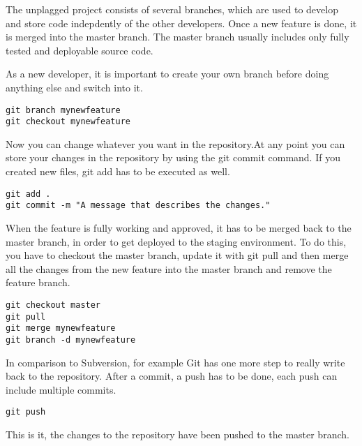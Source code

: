The unplagged project consists of several branches, which are used to develop and store code indepdently of the other developers. Once a new feature is done, it is merged into the master branch. The master branch usually includes only fully tested and deployable source code. 

As a new developer, it is important to create your own branch before doing anything else and switch into it.
\begin{verbatim}
git branch mynewfeature
git checkout mynewfeature
\end{verbatim}

Now you can change whatever you want in the repository.At any point you can store your changes in the repository by using the git commit command. If you created new files, git add has to be executed as well.

\begin{verbatim}
git add .
git commit -m "A message that describes the changes."
\end{verbatim}

When the feature is fully working and approved, it has to be merged back to the master branch, in order to get deployed to the staging environment. To do this, you have to checkout the master branch, update it with git pull and then merge all the changes from the new feature into the master branch and remove the feature branch.
\begin{verbatim}
git checkout master
git pull
git merge mynewfeature
git branch -d mynewfeature
\end{verbatim}

In comparison to Subversion, for example Git has one more step to really write back to the repository. After a commit, a push has to be done, each push can include multiple commits.
\begin{verbatim}
git push
\end{verbatim}

This is it, the changes to the repository have been pushed to the master branch.

